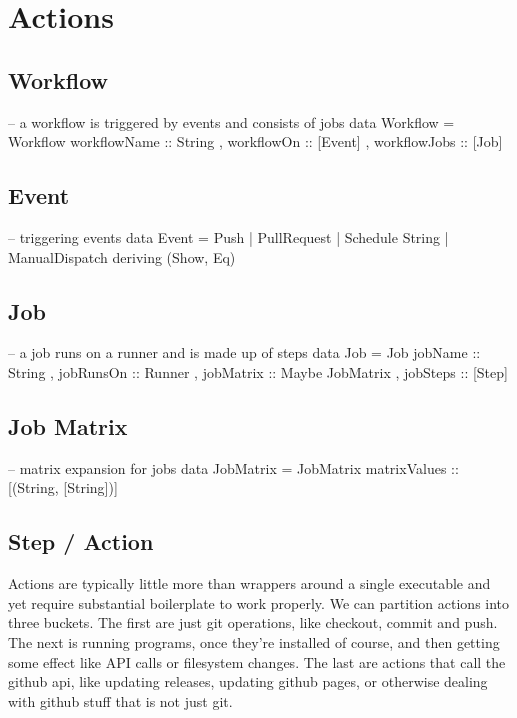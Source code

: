 \documentclass[openany, 12pt]{book}
\begin{document}
\part{Actions}
\chapter{Workflow}

\begin{haskell}{}
-- a workflow is triggered by events and consists of jobs
data Workflow = Workflow
  { workflowName :: String
  , workflowOn   :: [Event]
  , workflowJobs :: [Job]
  }
\end{haskell}

\chapter{Event}
\begin{haskell}{}
-- triggering events
data Event =
      Push
    | PullRequest
    | Schedule String
    | ManualDispatch
deriving (Show, Eq)
\end{haskell}

\chapter{Job}

\begin{haskell}{}
-- a job runs on a runner and is made up of steps
data Job = Job
  { jobName   :: String
  , jobRunsOn :: Runner
  , jobMatrix :: Maybe JobMatrix
  , jobSteps  :: [Step]
  }
\end{haskell}

\chapter{Job Matrix}
\begin{haskell}{}
-- matrix expansion for jobs
data JobMatrix = JobMatrix
  { matrixValues :: [(String, [String])]
  }
\end{haskell}

\chapter{Step / Action}
Actions are typically little more than wrappers around a single executable and
yet require substantial boilerplate to work properly. We can partition actions
into three buckets. The first are just git operations, like checkout, commit and
push.  The next is running programs, once they're installed of course, and then
getting some effect like API calls or filesystem changes. The last are actions
that call the github api, like updating releases, updating github pages, or
otherwise dealing with github stuff that is not just git.
\end{document}
